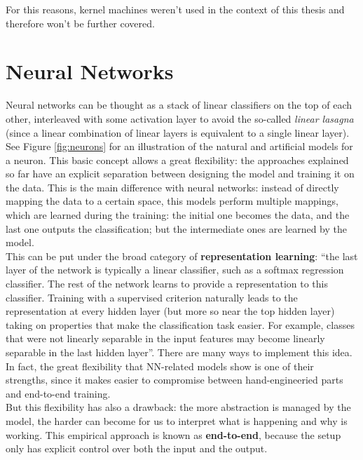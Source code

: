 For this reasons, kernel machines weren't used in the context of this thesis and therefore won't be further covered.


\section{Neural Networks}\label{neuralnetworks}

Neural networks can be thought as a stack of linear classifiers on the top of each other, interleaved with some activation layer to avoid the so-called {\it linear lasagna} (since a linear combination of linear layers is equivalent to a single linear layer).\\

See Figure \ref{fig:neurons} for an illustration of the natural and artificial models for a neuron. This basic concept allows a great flexibility: the approaches explained so far have an explicit separation between designing the model and training it on the data. This is the main difference with neural networks: instead of directly mapping the data to a certain space, this models perform multiple mappings, which are learned during the training: the initial one becomes the data, and the last one outputs the classification; but the intermediate ones are learned by the model.\\

This can be put under the broad category of \textbf{representation learning}: ``the last layer of the network is typically a linear classifier, such as a softmax regression classifier. The rest of the network learns to provide a representation to this classifier. Training with a supervised criterion naturally leads to the representation at every hidden layer (but more so near the top hidden layer) taking on properties that make the classification task easier. For example, classes that were not linearly separable in the input features may become linearly separable in the last hidden layer''\cite[p.530]{goodfellow}. There are many ways to implement this idea. In fact, the great flexibility that NN-related models show is one of their strengths, since it makes easier to compromise between hand-engineeried parts and end-to-end training.\\

But this flexibility has also a drawback: the more abstraction is managed by the model, the harder can become for us to interpret what is happening and why is working. This empirical approach is known as \textbf{end-to-end}, because the setup only has explicit control over both the input and the output.\\

